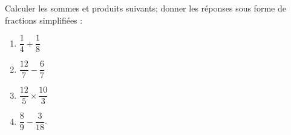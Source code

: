 
\begin{exercice}\label{exo2smath-0003}

    Calculer les sommes et produits suivants; donner les réponses sous forme de fractions simplifiées :
    \begin{multicols}{4}
        \begin{enumerate}
            \item
                \( \dfrac{ 1 }{ 4 }+\dfrac{ 1 }{ 8 } \)
            \item
                \( \dfrac{ 12 }{ 7 }-\dfrac{ 6 }{ 7 }\)
            \item
                \( \dfrac{ 12 }{ 5 }\times \dfrac{ 10 }{ 3 }\)
            \item
                \( \dfrac{ 8 }{ 9 } - \dfrac{ 3 }{ 18 }\).
        \end{enumerate}
    \end{multicols}


\end{exercice}
